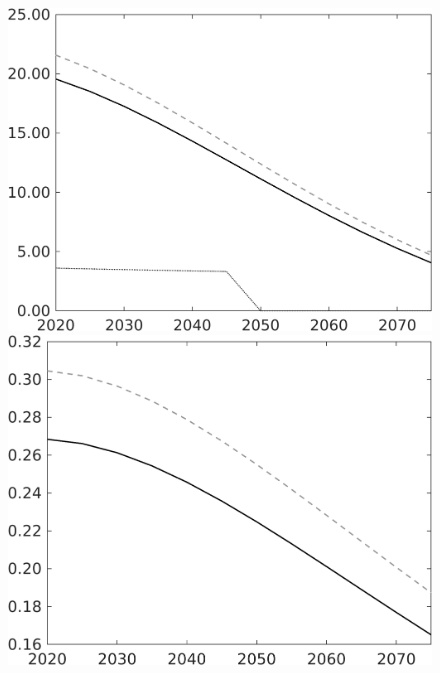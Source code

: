 \documentclass[12pt]{article}
\begin{document}
\begin{figure}[h!!]
\begin{minipage}[]{0.32\textwidth}
		\includegraphics[width=1\textwidth]{../../codding_model/own_basedOnFried/optimalPol_010922_revision/figures/all_13Sept22/CompTauf_bytaul_Equlab_Reg0_Emnet_spillover0_nsk0_xgr1_knspil1_sep1_LFlimit0_emsbase0_countec0_GovRev0_etaa0.79_lgd0.png}
	\end{minipage}	
	\begin{minipage}[]{0.32\textwidth}
		\includegraphics[width=1\textwidth]{../../codding_model/own_basedOnFried/optimalPol_010922_revision/figures/all_13Sept22/PerdifNoTauf_Equlab_regime0_CompTaul_hh_spillover0_nsk0_xgr0_knspil1_sep1_LFlimit0_emsbase0_countec0_GovRev0_etaa0.79_lgd0.png}

\end{minipage}
\end{figure}
\end{document}
